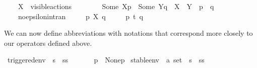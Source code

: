 \begin{isabellebody}
\ \ \ \ {\isacartoucheopen}X\ {\isasymsubseteq}\ visible{\isacharunderscore}{\kern0pt}actions\ {\isasymLongrightarrow}\ \isanewline
\ \ \ \ \ \ {\isacharparenleft}{\kern0pt}{\isasymtheta}{\isacharquery}{\kern0pt}{\isacharbrackleft}{\kern0pt}Some\ X{\isacharbrackright}{\kern0pt}{\isacharparenleft}{\kern0pt}p{\isacharparenright}{\kern0pt}\ {\isacharequal}{\kern0pt}\ {\isasymtheta}{\isacharquery}{\kern0pt}{\isacharbrackleft}{\kern0pt}Some\ Y{\isacharbrackright}{\kern0pt}{\isacharparenleft}{\kern0pt}q{\isacharparenright}{\kern0pt}{\isacharparenright}{\kern0pt}\ {\isasymlongrightarrow}\ X\ {\isacharequal}{\kern0pt}\ Y\ {\isasymand}\ p\ {\isacharequal}{\kern0pt}\ q{\isacartoucheclose}\isanewline
\ \ \ \ \isanewline
\isanewline
\ \ \ \ no{\isacharunderscore}{\kern0pt}epsilon{\isacharunderscore}{\kern0pt}in{\isacharunderscore}{\kern0pt}tran{\isacharcolon}{\kern0pt}\isanewline
\ \ \ \ {\isacartoucheopen}{\isasymnot}\ p\ {\isasymlongmapsto}{\isasymepsilon}{\isacharbrackleft}{\kern0pt}X{\isacharbrackright}{\kern0pt}\ q{\isacartoucheclose}\isanewline
\ \ \ \ {\isacartoucheopen}{\isasymnot}\ p\ {\isasymlongmapsto}t{\isacharunderscore}{\kern0pt}{\isasymepsilon}\ q{\isacartoucheclose}\isanewline
{}%
\begin{isamarkuptext}%
We can now define abbreviations with notations that correspond more closely to our operators defined above.%
\end{isamarkuptext}\isamarkuptrue%
\isamarkupfalse%
\ triggered{\isacharunderscore}{\kern0pt}env\ {\isacharcolon}{\kern0pt}{\isacharcolon}{\kern0pt}\ {\isacartoucheopen}{\isacharprime}{\kern0pt}s\ {\isasymRightarrow}\ {\isacharprime}{\kern0pt}ss{\isacartoucheclose}\ \isanewline
\ \ {\isacharparenleft}{\kern0pt}{\isacartoucheopen}{\isasymtheta}{\isacharprime}{\kern0pt}{\isacharparenleft}{\kern0pt}{\isacharunderscore}{\kern0pt}{\isacharprime}{\kern0pt}{\isacharparenright}{\kern0pt}{\isacartoucheclose}{\isacharparenright}{\kern0pt}\isanewline
\ \ \ {\isacartoucheopen}{\isasymtheta}{\isacharparenleft}{\kern0pt}p{\isacharparenright}{\kern0pt}\ {\isasymequiv}\ {\isasymtheta}{\isacharquery}{\kern0pt}{\isacharbrackleft}{\kern0pt}None{\isacharbrackright}{\kern0pt}{\isacharparenleft}{\kern0pt}p{\isacharparenright}{\kern0pt}{\isacartoucheclose}\isanewline
{}\isamarkupfalse%
\ stable{\isacharunderscore}{\kern0pt}env\ {\isacharcolon}{\kern0pt}{\isacharcolon}{\kern0pt}\ {\isacartoucheopen}{\isacharprime}{\kern0pt}a\ set\ {\isasymRightarrow}\ {\isacharprime}{\kern0pt}s\ {\isasymRightarrow}\ {\isacharprime}{\kern0pt}ss{\isacartoucheclose}\ \isanewline

\end{isabellebody}
